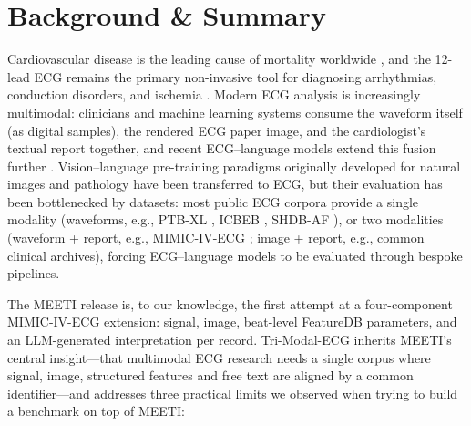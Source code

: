 \documentclass[12pt,letterpaper]{article}
\begin{document}
\section*{Background \& Summary}

Cardiovascular disease is the leading cause of mortality worldwide \cite{martin20252025}, and the 12-lead ECG remains the primary non-invasive tool for diagnosing arrhythmias, conduction disorders, and ischemia \cite{tan2025pediatric, yagi2024routine, zheng202012}. Modern ECG analysis is increasingly multimodal: clinicians and machine learning systems consume the waveform itself (as digital samples), the rendered ECG paper image, and the cardiologist's textual report together, and recent ECG--language models extend this fusion further \cite{li2024frozen, li2025electrocardiogram, lan2025gem, zhao2025ecg}. Vision--language pre-training paradigms originally developed for natural images and pathology \cite{radford2021clip, li2023blip2, huang2023visual, thawkar2023xraygpt} have been transferred to ECG, but their evaluation has been bottlenecked by datasets: most public ECG corpora provide a single modality (waveforms, e.g., PTB-XL \cite{wagner2020ptb}, ICBEB \cite{zheng2020121}, SHDB-AF \cite{tsutsui2025shdb}), or two modalities (waveform + report, e.g., MIMIC-IV-ECG \cite{gow2023mimic}; image + report, e.g., common clinical archives), forcing ECG--language models to be evaluated through bespoke pipelines.

The MEETI release \cite{zhang2024meeti} is, to our knowledge, the first attempt at a four-component MIMIC-IV-ECG extension: signal, image, beat-level FeatureDB parameters, and an LLM-generated interpretation per record. Tri-Modal-ECG inherits MEETI's central insight---that multimodal ECG research needs a single corpus where signal, image, structured features and free text are aligned by a common identifier---and addresses three practical limits we observed when trying to build a benchmark on top of MEETI:
\end{document}
